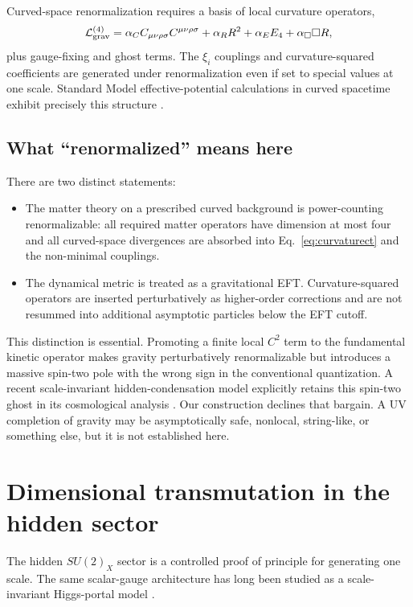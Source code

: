 \documentclass[11pt,a4paper]{article}
\newcommand{\Lag}{\mathcal{L}}
\begin{document}
Curved-space renormalization requires a basis of local curvature operators,
\begin{equation}
\Lag_{\rm grav}^{(4)}=
\alpha_C C_{\mu\nu\rho\sigma}C^{\mu\nu\rho\sigma}
+\alpha_RR^2+\alpha_EE_4+\alpha_\Box\Box R,
\label{eq:curvaturect}
\end{equation}
plus gauge-fixing and ghost terms. The $\xi_i$ couplings and curvature-squared coefficients are generated under renormalization even if set to special values at one scale. Standard Model effective-potential calculations in curved spacetime exhibit precisely this structure \cite{Markkanen2018}.

\subsection{What ``renormalized'' means here}

There are two distinct statements:

\begin{itemize}
  \item The matter theory on a prescribed curved background is power-counting renormalizable: all required matter operators have dimension at most four and all curved-space divergences are absorbed into Eq.~\eqref{eq:curvaturect} and the non-minimal couplings.
  \item The dynamical metric is treated as a gravitational EFT. Curvature-squared operators are inserted perturbatively as higher-order corrections and are not resummed into additional asymptotic particles below the EFT cutoff.
\end{itemize}

This distinction is essential. Promoting a finite local $C^2$ term to the fundamental kinetic operator makes gravity perturbatively renormalizable but introduces a massive spin-two pole with the wrong sign in the conventional quantization. A recent scale-invariant hidden-condensation model explicitly retains this spin-two ghost in its cosmological analysis \cite{Wami2026}. Our construction declines that bargain. A UV completion of gravity may be asymptotically safe, nonlocal, string-like, or something else, but it is not established here.

\section{Dimensional transmutation in the hidden sector}

The hidden $SU(2)_X$ sector is a controlled proof of principle for generating one scale. The same scalar-gauge architecture has long been studied as a scale-invariant Higgs-portal model \cite{CaroneRamos2013}.
\end{document}
